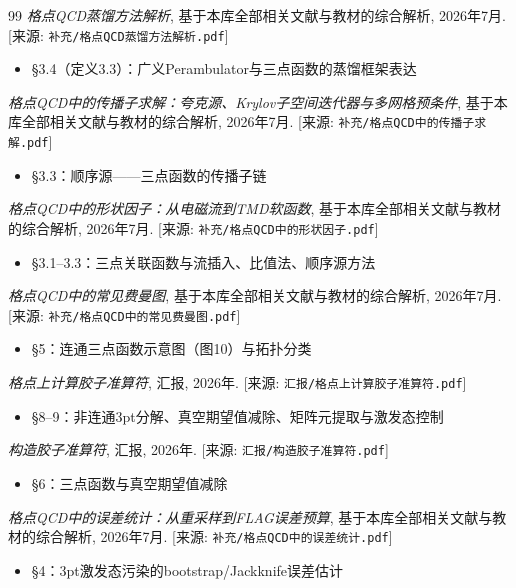 \documentclass[12pt,a4paper]{ctexart}
\theoremstyle{definition}
\begin{document}
\begin{thebibliography}{99}
\textit{格点QCD蒸馏方法解析},
基于本库全部相关文献与教材的综合解析, 2026年7月.
[来源: \texttt{补充/格点QCD蒸馏方法解析.pdf}]
\begin{itemize}
    \item §3.4（定义3.3）：广义Perambulator与三点函数的蒸馏框架表达
\end{itemize}

\textit{格点QCD中的传播子求解：夸克源、Krylov子空间迭代器与多网格预条件},
基于本库全部相关文献与教材的综合解析, 2026年7月.
[来源: \texttt{补充/格点QCD中的传播子求解.pdf}]
\begin{itemize}
    \item §3.3：顺序源——三点函数的传播子链
\end{itemize}

\textit{格点QCD中的形状因子：从电磁流到TMD软函数},
基于本库全部相关文献与教材的综合解析, 2026年7月.
[来源: \texttt{补充/格点QCD中的形状因子.pdf}]
\begin{itemize}
    \item §3.1--3.3：三点关联函数与流插入、比值法、顺序源方法
\end{itemize}

\textit{格点QCD中的常见费曼图},
基于本库全部相关文献与教材的综合解析, 2026年7月.
[来源: \texttt{补充/格点QCD中的常见费曼图.pdf}]
\begin{itemize}
    \item §5：连通三点函数示意图（图10）与拓扑分类
\end{itemize}

\textit{格点上计算胶子准算符},
汇报, 2026年.
[来源: \texttt{汇报/格点上计算胶子准算符.pdf}]
\begin{itemize}
    \item §8--9：非连通3pt分解、真空期望值减除、矩阵元提取与激发态控制
\end{itemize}

\textit{构造胶子准算符},
汇报, 2026年.
[来源: \texttt{汇报/构造胶子准算符.pdf}]
\begin{itemize}
    \item §6：三点函数与真空期望值减除
\end{itemize}

\textit{格点QCD中的误差统计：从重采样到FLAG误差预算},
基于本库全部相关文献与教材的综合解析, 2026年7月.
[来源: \texttt{补充/格点QCD中的误差统计.pdf}]
\begin{itemize}
    \item §4：3pt激发态污染的bootstrap/Jackknife误差估计
\end{itemize}


\end{thebibliography}
\end{document}
